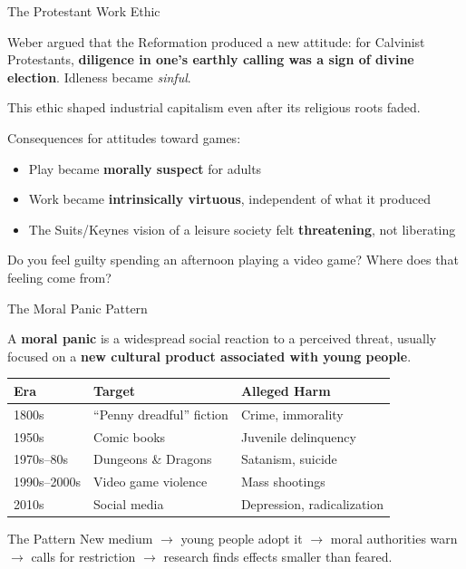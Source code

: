 \documentclass[aspectratio=169,11pt]{beamer}
\begin{document}
\begin{frame}[t]{The Protestant Work Ethic}
\begin{conceptbox}
\footnotesize
Weber argued that the Reformation produced a new attitude: for Calvinist Protestants, \textbf{diligence in one's earthly calling was a sign of divine election}. Idleness became \emph{sinful}.

\vspace{0.1cm}
This ethic shaped industrial capitalism even after its religious roots faded.
\end{conceptbox}

\vspace{0.15cm}
\footnotesize
Consequences for attitudes toward games:
\begin{itemize}
    \item Play became \textbf{morally suspect} for adults
    \item Work became \textbf{intrinsically virtuous}, independent of what it produced
    \item The Suits/Keynes vision of a leisure society felt \textbf{threatening}, not liberating
\end{itemize}

\begin{discussionbox}[Discussion]
\scriptsize
Do you feel guilty spending an afternoon playing a video game? Where does that feeling come from?
\end{discussionbox}
\end{frame}

\begin{frame}[t]{The Moral Panic Pattern}
\begin{conceptbox}
\footnotesize
A \textbf{moral panic} is a widespread social reaction to a perceived threat, usually focused on a \textbf{new cultural product associated with young people}.
\end{conceptbox}

\vspace{0.05cm}
\begin{center}
\scriptsize
\begin{tabular}{lll}
\toprule
\textbf{Era} & \textbf{Target} & \textbf{Alleged Harm} \\
\midrule
1800s & ``Penny dreadful'' fiction & Crime, immorality \\
1950s & Comic books & Juvenile delinquency \\
1970s--80s & Dungeons \& Dragons & Satanism, suicide \\
1990s--2000s & Video game violence & Mass shootings \\
2010s & Social media & Depression, radicalization \\
\bottomrule
\end{tabular}
\end{center}

\begin{alertblock}{The Pattern}
\scriptsize
New medium $\to$ young people adopt it $\to$ moral authorities warn $\to$ calls for restriction $\to$ research finds effects smaller than feared.
\end{alertblock}
\end{frame}
\end{document}
